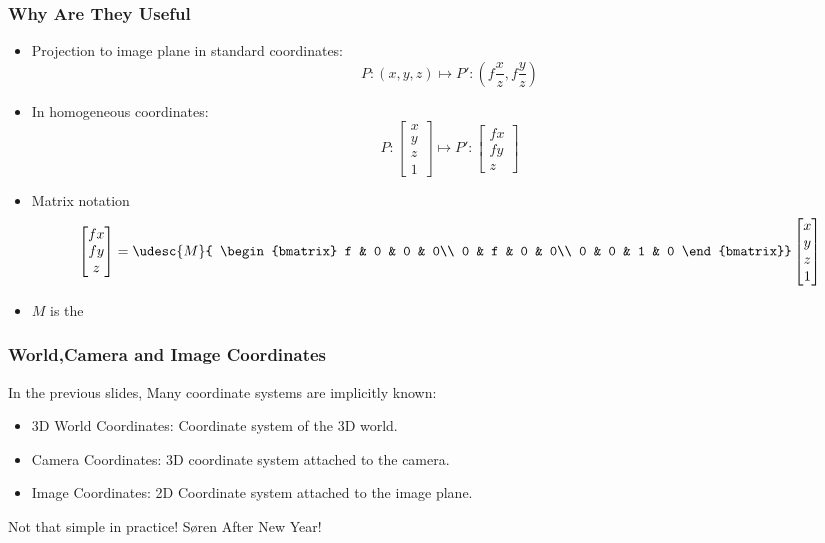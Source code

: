 \documentclass[9pt]{beamer}
\newcommand{\myemph}[1]{{\color{blue}{#1}}}
\begin{document}

\begin{frame}
  \frametitle{Why Are They Useful}
  \begin{itemize}
  \item Projection to image plane in standard coordinates:
    $$
    P: (x,y,z)\mapsto P': (f\frac{x}{z}, f\frac{y}{z})
    $$
  \item In homogeneous coordinates:\pause
    $$
    P:
    \begin{bmatrix}
      x\\y\\z\\1
    \end{bmatrix}
    \mapsto P': 
    \begin{bmatrix}
      fx\\fy\\z
    \end{bmatrix}
    $$
  \item Matrix notation
    $$
     \begin{bmatrix}
      fx\\fy\\z
    \end{bmatrix}
    = \udesc{M}{
    \begin{bmatrix}
      f & 0 & 0 & 0\\
      0 & f & 0 & 0\\
      0 & 0 & 1 & 0
    \end{bmatrix}}
    \begin{bmatrix}
      x\\y\\z\\1
    \end{bmatrix}
    $$
    \item $M$ is the \myemph{Camera Matrix}
  \end{itemize}
\end{frame}


\begin{frame}
  \frametitle{World,Camera and Image Coordinates}
  In the previous slides, Many coordinate systems are implicitly known:
  \begin{itemize}
  \item 3D World Coordinates: Coordinate system of the 3D world.
  \item Camera Coordinates: 3D coordinate system attached to the camera.
  \item Image Coordinates: 2D Coordinate system attached to the image plane.
  \end{itemize}
  Not that simple in practice! S{\o}ren After New Year!
\end{frame}
\end{document}
